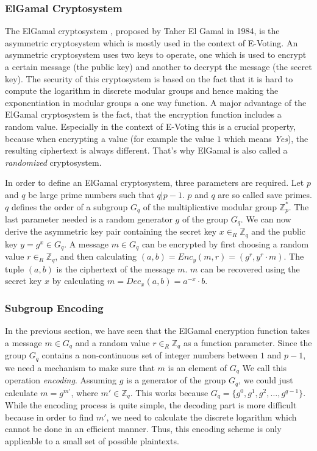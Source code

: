 \documentclass[numbers=noenddot, abstract=on, a4paper, headsepline,
footsepline, oneside, draft=off]{scrreprt}
\begin{document}
\subsubsection{ElGamal Cryptosystem}
\label{sec:elgamal}
The ElGamal cryptosystem \cite{EG84}, proposed by Taher El Gamal in 1984, is the
asymmetric cryptosystem which is mostly used in the context of E-Voting. An
asymmetric cryptosystem uses two keys to operate, one which is used to encrypt a
certain message (the public key) and another to decrypt the message (the secret
key). The security of this cryptosystem is based on the fact that it is hard to
compute the logarithm in discrete modular groups and hence making the
exponentiation in modular groups a one way function. A major advantage of the
ElGamal cryptosystem is the fact, that the encryption function includes a random
value. Especially in the context of E-Voting this is a crucial property, because
when encrypting a value (for example the value $1$ which means \textit{Yes}),
the resulting ciphertext is always different. That's why ElGamal is also called
a \textit{randomized} cryptosystem.

In order to define an ElGamal cryptosystem, three parameters are required. Let
$p$ and $q$ be large prime numbers such that $q|p-1$. $p$ and $q$ are so called
save primes. $q$ defines the order of a subgroup $G_q$ of the multiplicative
modular group $\mathbb{Z}^*_p$. The last parameter needed is a random generator
$g$ of the group $G_q$. We can now derive the asymmetric key pair containing the
secret key $x \in_R \mathbb{Z}_q$ and the public key $y=g^x \in G_q$. A message
$m \in G_q$ can be encrypted by first choosing a random value $r \in_R
\mathbb{Z}_q$, and then calculating $(a, b)=Enc_y(m, r)=(g^r, y^r \cdot m)$. The
tuple $(a, b)$ is the ciphertext of the message $m$. $m$ can be recovered using
the secret key $x$ by calculating $m=Dec_x(a, b)=a^{-x} \cdot b$.

\subsubsection{Subgroup Encoding}
\label{sec:subgroupencoding}
In the previous section, we have seen that the ElGamal encryption function takes
a message $m \in G_q$ and a random value $r \in_R \mathbb{Z}_q$ as a function
parameter. Since the group $G_q$ contains a non-continuous set of integer numbers
between $1$ and $p-1$, we need a mechanism to make sure that $m$ is an element
of $G_q$ We call this operation \textit{encoding}.
Assuming $g$ is a generator of the group $G_q$, we could just calculate
$m=g^{m'}$, where $m' \in \mathbb{Z}_q$. This works because $G_q = \{g^0, g^1,
g^2, \ldots, g^{q-1}\}$. While the encoding process is quite simple, the
decoding part is more difficult because in order to find $m'$, we need to
calculate the discrete logarithm which cannot be done in an efficient manner.
Thus, this encoding scheme is only applicable to a small set of possible
plaintexts.
\end{document}
